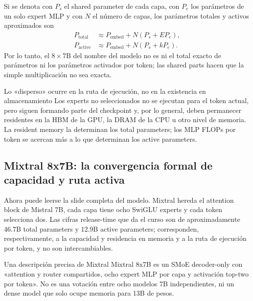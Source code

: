 Si se denota con $P_s$ el shared parameter de cada capa, con $P_e$ los parámetros de un solo expert MLP y con $N$ el número de capas, los parámetros totales y activos aproximados son
\begin{align*}
P_{\text{total}} &\approx P_{\text{embed}}+N(P_s+E P_e),\\
P_{\text{active}} &\approx P_{\text{embed}}+N(P_s+k P_e).
\end{align*}
Por lo tanto, el $8\times 7\mathrm{B}$ del nombre del modelo no es ni el total exacto de parámetros ni los parámetros activados por token; las shared parts hacen que la simple multiplicación no sea exacta.

\begin{warningbox}{Lo «disperso» ocurre en la ruta de ejecución, no en la existencia en almacenamiento}
Los experts no seleccionados no se ejecutan para el token actual, pero siguen formando parte del checkpoint y, por lo general, deben permanecer residentes en la HBM de la GPU, la DRAM de la CPU u otro nivel de memoria. La resident memory la determinan los total parameters; los MLP FLOPs por token se acercan más a lo que determinan los active parameters.
\end{warningbox}

\subsection{Mixtral 8x7B: la convergencia formal de capacidad y ruta activa}

Ahora puede leerse la slide completa del modelo. Mixtral hereda el attention block de Mistral 7B, cada capa tiene ocho SwiGLU experts y cada token selecciona dos. Las cifras release-time que da el curso son de aproximadamente 46.7B total parameters y 12.9B active parameters; corresponden, respectivamente, a la capacidad y residencia en memoria y a la ruta de ejecución por token, y no son intercambiables.


\begin{importantbox}{Una descripción precisa de Mixtral}
Mixtral 8x7B es un SMoE decoder-only con «attention y router compartidos, ocho expert MLP por capa y activación top-two por token». No es una votación entre ocho modelos 7B independientes, ni un dense model que solo ocupe memoria para 13B de pesos.
\end{importantbox}

